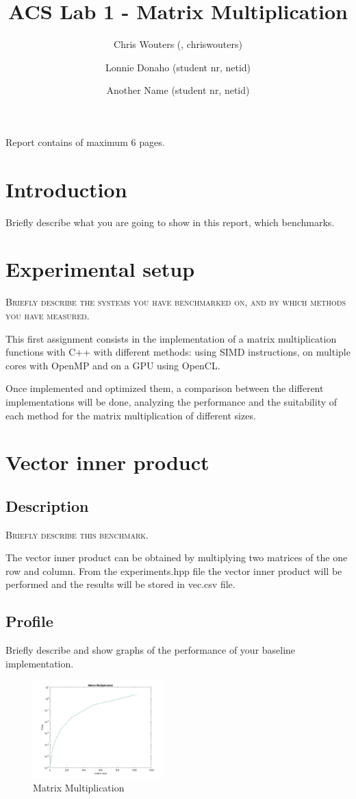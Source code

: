 \documentclass[twocolumn]{article}
\title{\large{\textbf{ACS Lab 1 - Matrix Multiplication}}}
\author{
    \small Chris Wouters (, chriswouters)
    \and \small Lonnie Donaho (student nr, netid)
    \and \small Another Name (student nr, netid)
}
\date{}
\begin{document}
\maketitle

\begin{center}
    \footnotesize{Report contains \pageref{LastPage} of maximum 6 pages.}
\end{center}

\section{Introduction}
Briefly describe what you are going to show in this report, which benchmarks.

\section{Experimental setup}
\textsc{Briefly describe the systems you have benchmarked on, and by which methods you have measured.}


This first assignment consists in the implementation of a matrix multiplication functions with C++ with different methods: using SIMD instructions, on multiple cores with OpenMP and on a GPU using OpenCL.

Once implemented  and  optimized them, a comparison between the different implementations  will be done, analyzing the performance  and the suitability of each method for the  matrix multiplication of  different sizes.


\section{Vector inner product}
\subsection{Description}
\textsc{Briefly describe this benchmark.}

The vector inner product can be obtained by multiplying two matrices of the one row and column.
From the experiments.hpp file the vector inner product will be performed and the results will be stored in vec.csv file.

\subsection{Profile}
Briefly describe and show graphs of the performance of your baseline implementation.
\begin{figure}[h]
    \centering
    \includegraphics[width=0.45\textwidth]{matrix_mult.jpg}
    \caption{Matrix Multiplication}
    \label{fig:OpenMP_base}
\end{figure}
\end{document}
